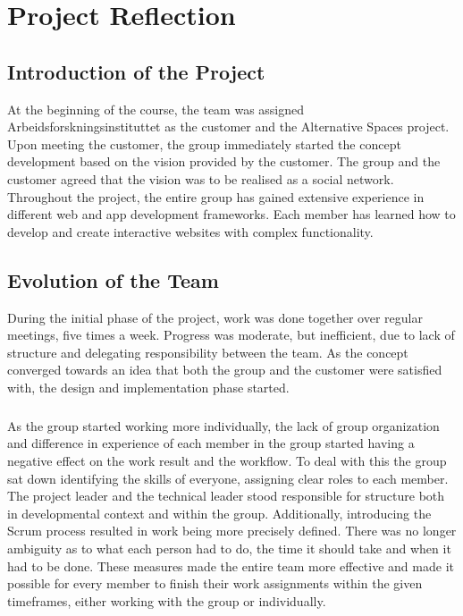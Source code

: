 \chapter{Project Reflection}
\label{chap:Eval}


\section{Introduction of the Project}

At the beginning of the course, the team was assigned Arbeidsforskningsinstituttet as the customer and the Alternative Spaces project. Upon meeting the customer, the group immediately started the concept development based on the vision provided by the customer. The group and the customer agreed that the vision was to be realised as a social network. Throughout the project, the entire group has gained extensive experience in different web and app development frameworks. Each member has learned how to develop and create interactive websites with complex functionality. 

\section{Evolution of the Team}

During the initial phase of the project, work was done together over regular meetings, five times a week. Progress was moderate, but inefficient, due to lack of structure and delegating responsibility between the team. As the concept converged towards an idea that both the group and the customer were satisfied with, the design and implementation phase started. 

\paragraph{} As the group started working more individually, the lack of group organization and difference in experience of each member in the group started having a negative effect on the work result and the workflow. To deal with this the group sat down identifying the skills of everyone, assigning clear roles to each member. The project leader and the technical leader stood responsible for structure both in developmental context and within the group. Additionally, introducing the Scrum process resulted in work being more precisely defined. There was no longer ambiguity as to what each person had to do, the time it should take and when it had to be done. These measures made the entire team more effective and made it possible for every member to finish their work assignments within the given timeframes, either working with the group or individually.

